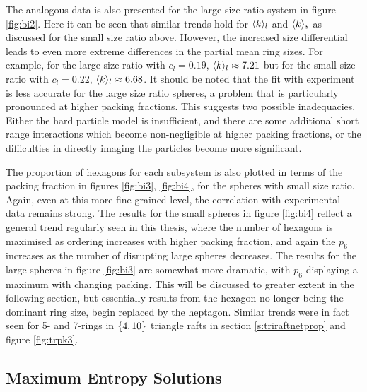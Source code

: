 The analogous data is also presented for the large size ratio system in figure \ref{fig:bi2}.
Here it can be seen that similar trends hold for $\langle k \rangle_l$ and $\langle k \rangle_s$ as discussed for the small size ratio above. 
However, the increased size differential leads to even more extreme differences in the partial mean ring sizes.
For example, for the large size ratio with $c_l=0.19$, $\langle k \rangle_l\approx7.21$ but for the small size ratio with $c_l=0.22$, $\langle k \rangle_l\approx6.68$.
It should be noted that the fit with experiment is less accurate for the large size ratio spheres, a problem that is particularly pronounced at higher packing fractions.
This suggests two possible inadequacies.
Either the hard particle model is insufficient, and there are some additional short range interactions which become non\--negligible at higher packing fractions, or the difficulties in directly imaging the particles become more significant. 

The proportion of hexagons for each subsystem is also plotted in terms of the packing fraction in figures \ref{fig:bi3}, \ref{fig:bi4}, for the spheres with small size ratio.
Again, even at this more fine\--grained level, the correlation with experimental data remains strong.
The results for the small spheres in figure \ref{fig:bi4} reflect a general trend regularly seen in this thesis, where the number of hexagons is maximised as ordering increases with higher packing fraction, and again the $p_6$ increases as the number of disrupting large spheres decreases.
The results for the large spheres in figure \ref{fig:bi3} are somewhat more dramatic, with $p_6$ displaying a maximum with changing packing.
This will be discussed to greater extent in the following section, but essentially results from the hexagon no longer being the dominant ring size, begin replaced by the heptagon.
Similar trends were in fact seen for 5\-- and 7\--rings in $\left\{4,10\right\}$ triangle rafts in section \ref{s:triraftnetprop} and figure \ref{fig:trpk3}. 

\subsection{Maximum Entropy Solutions}

